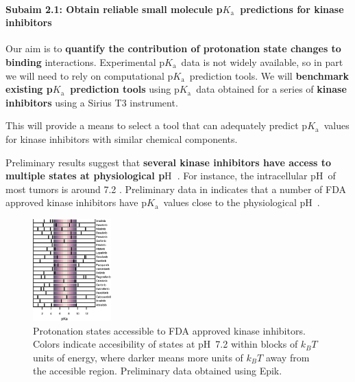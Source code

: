 \documentclass[10pt,final]{article}
\newcommand{\subsubsubsection}[1]{\paragraph*{#1}}
\newcommand{\pKa}{p$K_\mathrm{a}$\ }
\newcommand{\pH}{p$\mathrm{H}$\ }
\begin{document}
\subsubsubsection{Subaim 2.1: Obtain reliable small molecule \pKa predictions for kinase inhibitors}
Our aim is to \textbf{quantify the contribution of protonation state changes to binding} interactions. Experimental \pKa data is not widely available, so in part we will need to rely on computational \pKa prediction tools. We will \textbf{benchmark existing \pKa prediction tools}  using \pKa data obtained for a series of \textbf{kinase inhibitors} using a Sirius T3 instrument.

This will provide a means to select a tool that can adequately predict \pKa values for kinase inhibitors with similar chemical components.

Preliminary results suggest that \textbf{several kinase inhibitors have access to multiple states  at physiological \pH}. For instance, the intracellular \pH of most tumors is around 7.2 \cite{Griffiths1991a,Stubbs2000a}. Preliminary data in  indicates that a number of FDA approved kinase inhibitors have \pKa values close to the physiological \pH.
\begin{figure}[H]
	\centering
	\includegraphics[width=0.27\textwidth]{figures/inhibitor-pKas.png}
	\caption{Protonation states accessible to FDA approved kinase inhibitors. Colors indicate accesibility of states at \pH 7.2 within blocks of $k_BT$ units of energy, where darker means more units of $k_BT$ away from the accesible region. Preliminary data obtained using Epik.\cite{Shelley2007a,Greenwood2010a}}
	\label{figure:pka-kinase}
\end{figure}
\end{document}
